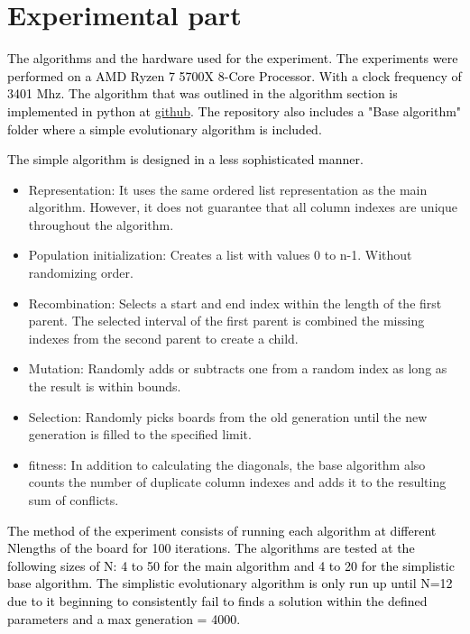 \documentclass{scrartcl}
\begin{document}
\section{Experimental part}
\label{sec:experimentation}

\textcolor{black}{The algorithms and the hardware used for the experiment. The experiments were performed on a AMD Ryzen 7 5700X 8-Core Processor. With a clock frequency of 3401 Mhz. The algorithm that was outlined in the algorithm section is implemented in python at \href{https://github.com/Sneakycloud/N-queens\_problem\_Evolutionary\_Alg/tree/main}{github}. The repository also includes a "Base algorithm" folder where a simple evolutionary algorithm is included.}

\textcolor{black}{The simple algorithm is designed in a less sophisticated manner.}
\begin{itemize}
	\item Representation: It uses the same ordered list representation as the main algorithm. However, it does not guarantee that all column indexes are unique throughout the algorithm.
	\item Population initialization:  Creates a list with values 0 to n-1. Without randomizing order.
	\item Recombination: Selects a start and end index within the length of the first parent. The selected interval of the first parent is combined the missing indexes from the second parent to create a child.
	\item Mutation: Randomly adds or subtracts one from a random index as long as the result is within bounds.
	\item Selection: Randomly picks boards from the old generation until the new generation is filled to the specified limit.
	\item fitness: In addition to calculating the diagonals, the base algorithm also counts the number of duplicate column indexes and adds it to the resulting sum of conflicts. 
\end{itemize}

\textcolor{black}{The method of the experiment consists of running each algorithm at different N\-lengths of the board for 100 iterations. The algorithms are tested at the following sizes of N: 4 to 50 for the main algorithm and 4 to 20 for the simplistic base algorithm. The simplistic evolutionary algorithm is only run up until N=12 due to it beginning to consistently fail to finds a solution within the defined parameters and a max generation = 4000.}
\end{document}
